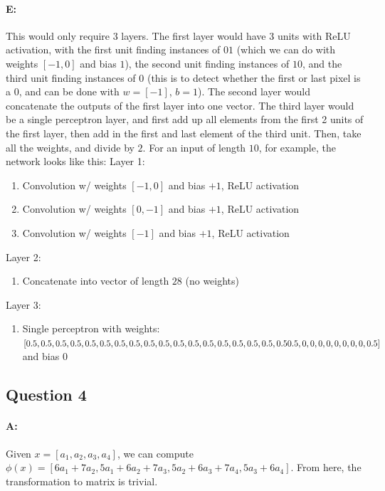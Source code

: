 \documentclass{article}
\begin{document}
\paragraph{E: } This would only require 3 layers. The first layer would have 3 units with ReLU activation, with the first unit finding instances of $01$ (which we can do with weights $[-1,0]$ and bias $1$), the second unit finding instances of $10$, and the third unit finding instances of $0$ (this is to detect whether the first or last pixel is a $0$, and can be done with $w=[-1]$, $b=1$). The second layer would concatenate the outputs of the first layer into one vector. The third layer would be a single perceptron layer, and first add up all elements from the first 2 units of the first layer, then add in the first and last element of the third unit. Then, take all the weights, and divide by $2$. For an input of length $10$, for example, the network looks like this: \newline
Layer 1:
\begin{enumerate}
    \item Convolution w/ weights $[-1,0]$ and bias $+1$, ReLU activation
    \item Convolution w/ weights $[0,-1]$ and bias $+1$, ReLU activation
    \item Convolution w/ weights $[-1]$ and bias $+1$, ReLU activation
\end{enumerate}
Layer 2:
\begin{enumerate}
    \item Concatenate into vector of length $28$ (no weights)
\end{enumerate}
Layer 3:
\begin{enumerate}
    \item Single perceptron with weights:\newline $[0.5,0.5,0.5,0.5,0.5,0.5,0.5,0.5,0.5,\newline 0.5,0.5,0.5,0.5,0.5,0.5,0.5,0.5,0.5\newline 0.5,0,0,0,0,0,0,0,0,0.5]$\newline and bias $0$
\end{enumerate}

\subsection{Question 4}

\paragraph{A: } Given $x=[a_1, a_2, a_3, a_4]$, we can compute $\phi(x)=[6a_1+7a_2, 5a_1+6a_2+7a_3, 5a_2+6a_3+7a_4, 5a_3+6a_4]$. From here, the transformation to matrix is trivial.
\end{document}
